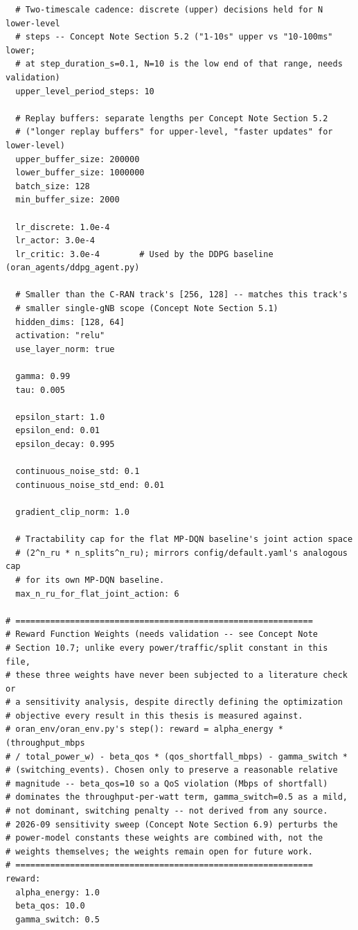 {\begin{verbatim}
  # Two-timescale cadence: discrete (upper) decisions held for N lower-level
  # steps -- Concept Note Section 5.2 ("1-10s" upper vs "10-100ms" lower;
  # at step_duration_s=0.1, N=10 is the low end of that range, needs validation)
  upper_level_period_steps: 10

  # Replay buffers: separate lengths per Concept Note Section 5.2
  # ("longer replay buffers" for upper-level, "faster updates" for lower-level)
  upper_buffer_size: 200000
  lower_buffer_size: 1000000
  batch_size: 128
  min_buffer_size: 2000

  lr_discrete: 1.0e-4
  lr_actor: 3.0e-4
  lr_critic: 3.0e-4        # Used by the DDPG baseline (oran_agents/ddpg_agent.py)

  # Smaller than the C-RAN track's [256, 128] -- matches this track's
  # smaller single-gNB scope (Concept Note Section 5.1)
  hidden_dims: [128, 64]
  activation: "relu"
  use_layer_norm: true

  gamma: 0.99
  tau: 0.005

  epsilon_start: 1.0
  epsilon_end: 0.01
  epsilon_decay: 0.995

  continuous_noise_std: 0.1
  continuous_noise_std_end: 0.01

  gradient_clip_norm: 1.0

  # Tractability cap for the flat MP-DQN baseline's joint action space
  # (2^n_ru * n_splits^n_ru); mirrors config/default.yaml's analogous cap
  # for its own MP-DQN baseline.
  max_n_ru_for_flat_joint_action: 6

# ============================================================
# Reward Function Weights (needs validation -- see Concept Note
# Section 10.7; unlike every power/traffic/split constant in this file,
# these three weights have never been subjected to a literature check or
# a sensitivity analysis, despite directly defining the optimization
# objective every result in this thesis is measured against.
# oran_env/oran_env.py's step(): reward = alpha_energy * (throughput_mbps
# / total_power_w) - beta_qos * (qos_shortfall_mbps) - gamma_switch *
# (switching_events). Chosen only to preserve a reasonable relative
# magnitude -- beta_qos=10 so a QoS violation (Mbps of shortfall)
# dominates the throughput-per-watt term, gamma_switch=0.5 as a mild,
# not dominant, switching penalty -- not derived from any source.
# 2026-09 sensitivity sweep (Concept Note Section 6.9) perturbs the
# power-model constants these weights are combined with, not the
# weights themselves; the weights remain open for future work.
# ============================================================
reward:
  alpha_energy: 1.0
  beta_qos: 10.0
  gamma_switch: 0.5


\end{verbatim}}
